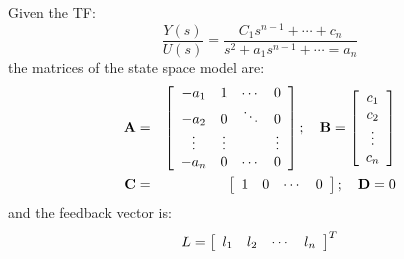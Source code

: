 Given the TF:
\[
\frac{Y(s)}{U(s)}=\frac{C_1s^{n-1}+\cdots+c_n}{s^2 + a_1s^{n-1}+\cdots=a_n}
\]
the matrices of the state space model are:
\begin{eqnarray*}
	 {\bf{A}} & = & \left[ {\begin{array}{*{20}c}
	   { - a_1 } & 1 &  \cdots  & 0  \\
	   { - a_2 } & 0 &  \ddots  & {0}  \\
	    \vdots  &  \vdots  & {} &  \vdots   \\
	   { - a_n } & 0 &  \cdots  & 0  \\
	\end{array}} \right];\quad {\bf{B}} = \left[ {\begin{array}{*{20}c}
	   {c_1 }  \\
	   {c_2 }  \\
	    \vdots   \\
	   {c_n }  \\
	\end{array}} \right] \\ 
	 {\bf{C}} & = & \left[ {\begin{array}{*{20}c}
	   1 & 0 &  \cdots  & 0  \\
	\end{array}} \right];\quad {\bf{D}} = 0 \\ 	
\end{eqnarray*}
and the feedback vector is:
\[
L = \left[ {\begin{array}{*{20}c}
   {l_1 } & {l_2 } &  \cdots  & {l_n }  \\
\end{array}} \right]^T 
\]

